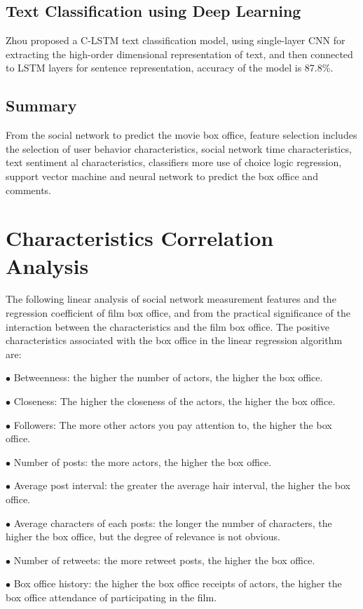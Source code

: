 \documentclass[review]{cvpr}
\begin{document}
\subsection{Text Classification using Deep Learning}

Zhou \etal proposed a C-LSTM text classification model, using single-layer CNN for extracting the high-order dimensional representation of text, and then connected to LSTM layers for sentence representation, accuracy of the model is 87.8\%.

\subsection{Summary}

From the social network to predict the movie box office, feature selection includes the selection of user behavior characteristics, social network time characteristics, text sentiment al characteristics, classifiers more use of choice logic regression, support vector machine and neural network to predict the box office and comments.


\section{Characteristics Correlation Analysis}

The following linear analysis of social network measurement features and the regression coefficient of film box office, and from the practical significance of the interaction between the characteristics and the film box office.
The positive characteristics associated with the box office in the linear regression algorithm are:
\par$\bullet$ Betweenness: the higher the number of actors, the higher the box office.
\par$\bullet$ Closeness: The higher the closeness of the actors, the higher the box office.
\par$\bullet$ Followers: The more other actors you pay attention to, the higher the box office.
\par$\bullet$ Number of posts: the more actors, the higher the box office.
\par$\bullet$ Average post interval: the greater the average hair interval, the higher the box office.
\par$\bullet$ Average characters of each posts: the longer the number of characters, the higher the box office, but the degree of relevance is not obvious.
\par$\bullet$ Number of retweets: the more retweet posts, the higher the box office.
\par$\bullet$ Box office history: the higher the box office receipts of actors, the higher the box office attendance of participating in the film.
\end{document}
